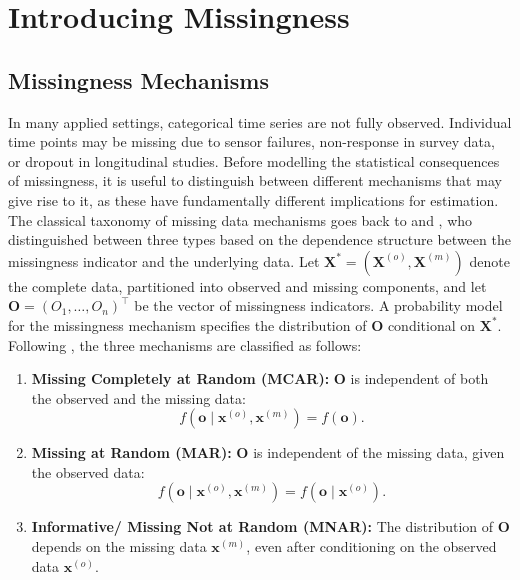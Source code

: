﻿\documentclass[12pt,a4paper]{scrreprt}
\theoremstyle{definition}
\begin{document}
\chapter{Introducing Missingness}\label{chap:missingness}
\section{Missingness Mechanisms}\label{sec:missingness}
In many applied settings, categorical time series are not fully 
observed. Individual time points may be missing due to sensor 
failures, non-response in survey data, or dropout in longitudinal 
studies. Before modelling the statistical consequences of 
missingness, it is useful to distinguish between different 
mechanisms that may give rise to it, as these have fundamentally 
different implications for estimation.\\
The classical taxonomy of missing data mechanisms goes back to 
\citet{Rubin1976} and \citet{little_rubin_2002}, who distinguished 
between three types based on the dependence structure between the 
missingness indicator and the underlying data. Let $\boldsymbol{X}^* 
= (\boldsymbol{X}^{(o)}, \boldsymbol{X}^{(m)})$ denote the complete 
data, partitioned into observed and missing components, and let 
$\boldsymbol{O} = (O_1, \ldots, O_n)^\top$ be the vector of 
missingness indicators. A probability model for the missingness 
mechanism specifies the distribution of $\boldsymbol{O}$ conditional 
on $\boldsymbol{X}^*$. Following \citet[Section~13]{diggle_2002}, 
the three mechanisms are classified as follows:
    
\begin{enumerate}
    \item \textbf{Missing Completely at Random (MCAR):} 
    $\boldsymbol{O}$ is independent of both the observed and the 
    missing data:
    \[
        f(\boldsymbol{o} \mid \boldsymbol{x}^{(o)}, 
        \boldsymbol{x}^{(m)}) = f(\boldsymbol{o}).
    \]
    \item \textbf{Missing at Random (MAR):} $\boldsymbol{O}$ is 
    independent of the missing data, given the observed data:
    \[
        f(\boldsymbol{o} \mid \boldsymbol{x}^{(o)}, 
        \boldsymbol{x}^{(m)}) = f(\boldsymbol{o} \mid 
        \boldsymbol{x}^{(o)}).
    \]
    \item \textbf{Informative/ Missing Not at Random (MNAR):} The distribution 
    of $\boldsymbol{O}$ depends on the missing data 
    $\boldsymbol{x}^{(m)}$, even after conditioning on the 
    observed data $\boldsymbol{x}^{(o)}$.
\end{enumerate}
\end{document}
